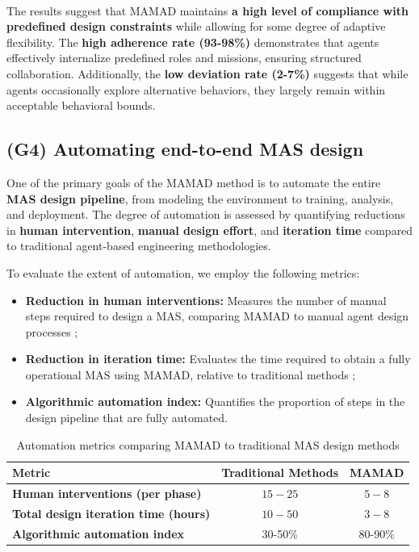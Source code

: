 \documentclass[pdflatex,sn-mathphys-num]{sn-jnl}%
\theoremstyle{thmstyleone}%
\theoremstyle{thmstyletwo}%
\theoremstyle{thmstylethree}%
\begin{document}
\

The results suggest that MAMAD maintains \textbf{a high level of compliance with predefined design constraints} while allowing for some degree of adaptive flexibility. The \textbf{high adherence rate (93-98\%)} demonstrates that agents effectively internalize predefined roles and missions, ensuring structured collaboration. Additionally, the \textbf{low deviation rate (2-7\%)} suggests that while agents occasionally explore alternative behaviors, they largely remain within acceptable behavioral bounds.

\subsection{(G4) Automating end-to-end MAS design}

One of the primary goals of the MAMAD method is to automate the entire \textbf{MAS design pipeline}, from modeling the environment to training, analysis, and deployment. The degree of automation is assessed by quantifying reductions in \textbf{human intervention}, \textbf{manual design effort}, and \textbf{iteration time} compared to traditional agent-based engineering methodologies.

To evaluate the extent of automation, we employ the following metrics:

\begin{itemize}
    \item \textbf{Reduction in human interventions:} Measures the number of manual steps required to design a MAS, comparing MAMAD to manual agent design processes ;
    \item \textbf{Reduction in iteration time:} Evaluates the time required to obtain a fully operational MAS using MAMAD, relative to traditional methods ;
    \item \textbf{Algorithmic automation index:} Quantifies the proportion of steps in the design pipeline that are fully automated.
\end{itemize}

\begin{table}[h!]
    \centering
    \caption{Automation metrics comparing MAMAD to traditional MAS design methods}
    \begin{tabular}{lcc}
        \hline
        \textbf{Metric}                              & \textbf{Traditional Methods} & \textbf{MAMAD} \\
        \hline
        \textbf{Human interventions (per phase)}     & $15 - 25$                    & $5 - 8$        \\
        \hline
        \textbf{Total design iteration time (hours)} & $10 - 50$                    & $3 - 8$        \\
        \hline
        \textbf{Algorithmic automation index}        & 30-50\%                      & 80-90\%        \\
        \hline
    \end{tabular}
    \label{tab:automation}
\end{table}
\end{document}
